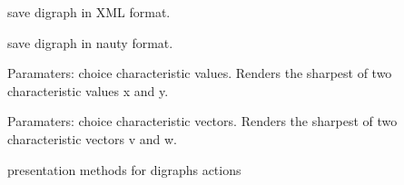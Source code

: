 \documentclass[letterpaper,10pt,english]{sphinxmanual}
\begin{document}
\begin{fulllineitems}
\begin{fulllineitems}
\end{fulllineitems}


\begin{fulllineitems}
\label{techDoc:digraphs.Digraph.saveXML}
save digraph in XML format.

\end{fulllineitems}


\begin{fulllineitems}
\label{techDoc:digraphs.Digraph.savedre}
save digraph in nauty format.

\end{fulllineitems}


\begin{fulllineitems}
\label{techDoc:digraphs.Digraph.sharp}
Paramaters: choice characteristic values.
Renders the sharpest of two characteristic values x and y.

\end{fulllineitems}


\begin{fulllineitems}
\label{techDoc:digraphs.Digraph.sharpvec}
Paramaters: choice characteristic vectors.
Renders the sharpest of two characteristic vectors v and w.

\end{fulllineitems}


\begin{fulllineitems}
\label{techDoc:digraphs.Digraph.showActions}
presentation methods for digraphs actions

\end{fulllineitems}



\end{fulllineitems}
\end{document}
